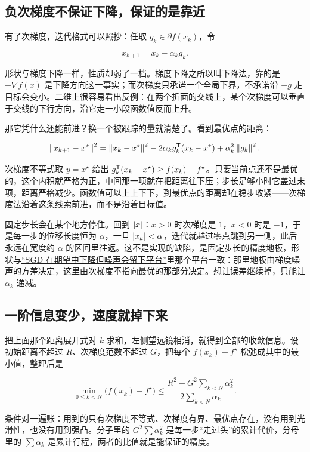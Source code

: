 \subsection{负次梯度不保证下降，保证的是靠近}

有了次梯度，迭代格式可以照抄：任取 \(g_k\in\partial f(x_k)\)，令

\[
x_{k+1}=x_k-\alpha_kg_k .
\]

形状与梯度下降一样，性质却弱了一档。梯度下降之所以叫下降法，靠的是 \(-\nabla f(x)\) 是下降方向这一事实；而次梯度只承诺一个全局下界，不承诺沿 \(-g\) 走目标会变小。二维上很容易看出反例：在两个折面的交线上，某个次梯度可以垂直于交线的下行方向，沿它走一小段函数值反而上升。

那它凭什么还能前进？换一个被跟踪的量就清楚了。看到最优点的距离：

\[
\left\lVert x_{k+1}-x^\star\right\rVert^2
=\left\lVert x_k-x^\star\right\rVert^2-2\alpha_kg_k^{\mathsf{T}}(x_k-x^\star)+\alpha_k^2\left\lVert g_k\right\rVert^2 .
\]

次梯度不等式取 \(y=x^\star\) 给出 \(g_k^{\mathsf{T}}(x_k-x^\star)\ge f(x_k)-f^\star\)。只要当前点还不是最优的，这个内积就严格为正，中间那一项就在把距离往下压；步长足够小时它盖过末项，距离严格减少。函数值可以上上下下，到最优点的距离却在稳步收紧——次梯度法沿着这条线索前进，而不是沿着目标值。

固定步长会在某个地方停住。回到 \(\left|x\right|\)：\(x>0\) 时次梯度是 \(1\)，\(x<0\) 时是 \(-1\)，于是每一步的位移长度恒为 \(\alpha\)，一旦 \(\left|x_k\right|<\alpha\)，迭代就越过零点跳到另一侧，此后永远在宽度约 \(\alpha\) 的区间里往返。这不是实现的缺陷，是固定步长的精度地板，形状与\hyperref[sec:09-Convex-Optimization/08-Nonconvex-and-Stochastic-Optimization/04]{``SGD 在期望中下降但噪声会留下平台''}里那个平台一致：那里地板由梯度噪声的方差决定，这里由次梯度不指向最优的那部分决定。想让误差继续掉，只能让 \(\alpha_k\) 递减。

\subsection{一阶信息变少，速度就掉下来}

把上面那个距离展开式对 \(k\) 求和，左侧望远镜相消，就得到全部的收敛信息。设初始距离不超过 \(R\)、次梯度范数不超过 \(G\)，把每个 \(f(x_k)-f^\star\) 松弛成其中的最小值，整理后是

\[
\min_{0\le k<N}\bigl(f(x_k)-f^\star\bigr)
\le
\frac{R^2+G^2\sum_{k<N}\alpha_k^2}{2\sum_{k<N}\alpha_k}.
\]

条件对一遍账：用到的只有次梯度不等式、次梯度有界、最优点存在，没有用到光滑性，也没有用到强凸。分子里的 \(G^2\sum\alpha_k^2\) 是每一步``走过头''的累计代价，分母里的 \(\sum\alpha_k\) 是累计行程，两者的比值就是能保证的精度。


